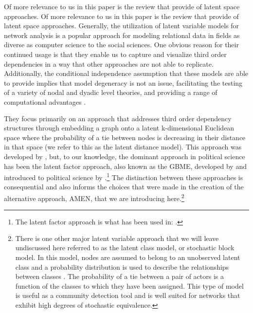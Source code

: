 Of more relevance to us in this paper is the review that \citet{cranmer:etal:2016} provide of latent space approaches. Of more relevance to us in this paper is the review that \citet{cranmer:etal:2016} provide of latent space approaches. Generally, the utilization of latent variable models for network analysis is a popular approach for modeling relational data in fields as diverse as computer science to the social sciences. One obvious reason for their continued usage is that they enable us to capture and visualize third order dependencies in a way that other approaches are not able to replicate. Additionally, the conditional independence assumption that these models are able to provide implies that model degeneracy is not an issue, facilitating the testing of a variety of nodal and dyadic level theories, and providing a range of computational advantages \citep{hunter:etal:2012}. 

They focus primarily on an approach that addresses third order dependency structures through embedding a graph onto a latent k-dimensional Euclidean space where the probability of a tie between nodes is decreasing in their distance in that space (we refer to this as the latent distance model). This approach was developed by \citet{hoff:etal:2002}, but, to our knowledge, the dominant approach in political science has been the latent factor approach, also known as the GBME, developed by \citet{hoff:2005} and introduced to political science by \citet{hoff:ward:2004}.\footnote{The latent factor approach is what has been used in: \citet{ward:etal:2007,cao:ward:2014,metternich:etal:2015}.} The distinction between these approaches is consequential and also informs the choices that were made in the creation of the alternative approach, AMEN, that we are introducing here.\footnote{There is one other major latent variable approach that we will leave undiscussed here referred to as the latent class model, or stochastic block model. In this model, nodes are assumed to belong to an unobserved latent class and a probability distribution is used to describe the relationships between classes \citep{nowicki:snijders:2001}. The probability of a tie between a pair of actors is a function of the classes to which they have been assigned. This type of model is useful as a community detection tool and is well suited for networks that exhibit high degrees of stochastic equivalence.} 


